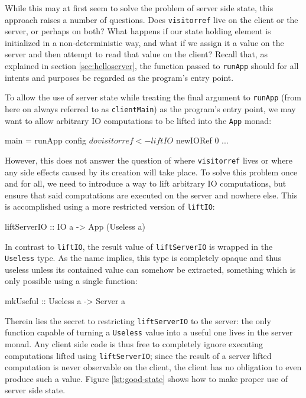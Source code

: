 \documentclass[preprint]{sigplanconf}
\begin{document}
While this may at first seem to solve the problem of server side state, this
approach raises a number of questions. Does \lstinline!visitorref! live on the
client or the server, or perhaps on both? What happens if our state holding
element is initialized in a non-deterministic way, and what if we assign it
a value on the server and then attempt to read that value on the client?
Recall that, as explained in section \ref{sec:helloserver}, the function
passed to \lstinline!runApp! should for all intents and purposes be regarded as
the program's entry point.

To allow the use of server state while treating the final argument to
\lstinline!runApp! (from here on always referred to as \lstinline!clientMain!)
as the program's entry point, we may want to allow arbitrary IO computations to
be lifted into the \lstinline!App! monad:

\begin{code}
main = runApp config $ do
  visitorref <- liftIO $ newIORef 0
  ...
\end{code}

However, this does not answer the question of where \lstinline!visitorref!
lives or where any side effects caused by its creation will take place.
To solve this problem once and for all, we need to introduce a way to lift
arbitrary IO computations, but ensure that said computations are executed on
the server and nowhere else. This is accomplished using a more restricted
version of \lstinline!liftIO!:

\begin{code}
liftServerIO :: IO a -> App (Useless a)
\end{code}

In contrast to \lstinline!liftIO!, the result value of \lstinline!liftServerIO!
is wrapped in the \lstinline!Useless! type. As the name implies, this type is
completely opaque and thus useless unless its contained value can somehow be
extracted, something which is only possible using a single function:

\begin{code}
mkUseful :: Useless a -> Server a
\end{code}

Therein lies the secret to restricting \lstinline!liftServerIO! to the
server: the only function capable of turning a \lstinline!Useless! value into
a useful one lives in the server monad. Any client side code is thus free to
completely ignore executing computations lifted using \lstinline!liftServerIO!;
since the result of a server lifted computation is never observable on the
client, the client has no obligation to even produce such a value.
Figure \ref{lst:good-state} shows how to make proper use of server side state.
\end{document}
